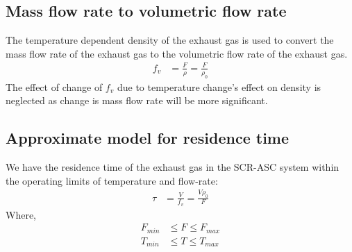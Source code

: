 \subsection{Mass flow rate to volumetric flow rate}
The temperature dependent density of the exhaust gas is used to convert the mass
flow rate of the exhaust gas to the volumetric flow rate of the exhaust gas.
\begin{align}
    f_v &= \frac{F}{\rho} = \frac{F}{\rho_0}  \label{eqn::fv_approx}
\end{align}
The effect of change of $f_v$ due to temperature change's effect on density is neglected as change is mass flow rate will be more significant.

\subsection{Approximate model for residence time}
We have the residence time of the exhaust gas in the SCR-ASC system within the operating limits of temperature and flow-rate:
\begin{align}
    \tau &= \frac{V}{f_v} = \frac{V \rho_0}{F} \label{eqn::res_time}
\end{align}
Where,
\begin{align*}
    F_{min} &\leq F \leq F_{max}\\
    T_{min} &\leq T \leq T_{max}
\end{align*}
